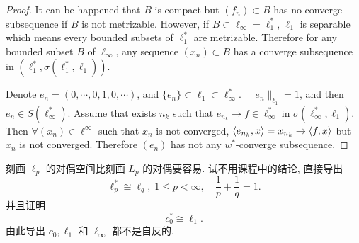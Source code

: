 \begin{proof}
    It can be happened that $B$ is compact but $(f_n)\subset B$ has no converge subsequence 
    if $B$ is not metrizable. However, if $B\subset \ell_\infty = \ell_1^*$, $\ell_1$ is separable 
    which means every bounded subsets of $\ell_1^*$ are metrizable. Therefore for any bounded subset 
    $B$ of $\ell_\infty$, any sequence $(x_n)\subset B$ has a converge subsequence in $(\ell_1^*, \sigma(\ell_1^*, \ell_1))$.  

    Denote $e_n = (0, \cdots, 0, 1, 0, \cdots)$, and $\{e_n\}\subset \ell_1\subset \ell_\infty^*$. 
    $\|e_n\|_{\ell_1} = 1$, and then $e_n\in S(\ell_\infty^*)$. Assume that exists $n_k$ such that 
    $e_{n_k}\to f\in \ell_\infty^*$ in $\sigma(\ell_\infty^*, \ell_1)$. Then $\forall (x_n)\in \ell^\infty$ 
    such that $x_n$ is not converged, $\langle e_{n_k},x\rangle = x_{n_k}\to \langle f,x\rangle$ but $x_n$ is not converged. 
    Therefore $(e_{n})$ has not any $w^*$-converge subsequence. 
\end{proof}



\begin{exercise}
    刻画 $\ell_p$ 的对偶空间比刻画 $L_p$ 的对偶要容易. 试不用课程中的结论, 直接导出
    \[\ell_{p}^{*} \cong \ell_{q},\;1\leq p<\infty,\quad\frac{1}{p}+\frac{1}{q}=1.\]
    并且证明
    \[c_{0}^{*} \cong \ell_{1}.\]
    由此导出 $c_{0}, \ell_{1}$ 和 $\ell_{\infty}$ 都不是自反的.
\end{exercise}

